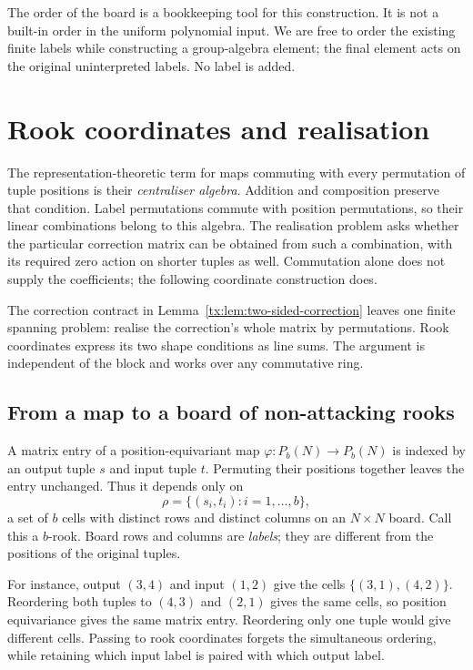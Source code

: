 \documentclass[11pt,a4paper,oneside,openany]{book}
\theoremstyle{definition}\newtheorem{definition}[theorem]{Definition}
\theoremstyle{remark}\newtheorem{remark}[theorem]{Remark}
\numberwithin{equation}{chapter}
\begin{document}
The order of the board is a bookkeeping tool for this construction.
It is not a built-in order in the uniform polynomial input. We are
free to order the existing finite labels while constructing a
group-algebra element; the final element acts on the original
uninterpreted labels. No label is added.

\section{Rook coordinates and realisation}\label{tx:sec:rooks}
The representation-theoretic term for maps commuting with every
permutation of tuple positions is their \emph{centraliser algebra}.
Addition and composition preserve that condition. Label permutations
commute with position permutations, so their linear combinations
belong to this algebra. The realisation problem asks whether the
particular correction matrix can be obtained from such a combination,
with its required zero action on shorter tuples as well.
Commutation alone does not supply the coefficients; the following
coordinate construction does.

The correction contract in Lemma~\ref{tx:lem:two-sided-correction} leaves one finite spanning problem: realise the correction's whole matrix by permutations. Rook coordinates express its two shape conditions as line sums. The argument is independent of the block and works over any commutative ring.

\subsection{From a map to a board of non-attacking rooks}
A matrix entry of a position-equivariant map $\varphi:P_b(N)\to P_b(N)$ is indexed by an output tuple $s$ and input tuple $t$. Permuting their positions together leaves the entry unchanged. Thus it depends only on
\[\rho=\{(s_i,t_i):i=1,\ldots,b\},
\]
a set of $b$ cells with distinct rows and distinct columns on an $N\times N$ board. Call this a $b$-rook. Board rows and columns are \emph{labels}; they are different from the positions of the original tuples.

For instance, output $(3,4)$ and input $(1,2)$ give the cells
$\{(3,1),(4,2)\}$. Reordering both tuples to $(4,3)$ and $(2,1)$
gives the same cells, so position equivariance gives the same matrix
entry. Reordering only one tuple would give different cells. Passing
to rook coordinates forgets the simultaneous ordering, while retaining
which input label is paired with which output label.
\end{document}
